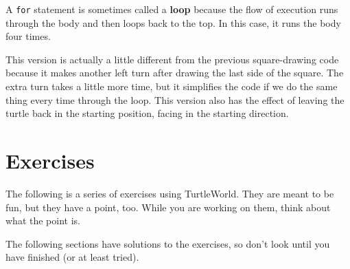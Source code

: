 \documentclass[10pt]{book}
\begin{document}

A {\tt for} statement is sometimes called a {\bf loop} because
the flow of execution runs through the body and then loops back
to the top.  In this case, it runs the body four times.

This version is actually a little different from the previous
square-drawing code because it makes another left turn after
drawing the last side of the square.  The extra turn takes a little
more time, but it simplifies the code if we do the same thing
every time through the loop.  This version also has the effect
of leaving the turtle back in the starting position, facing in
the starting direction.

\section{Exercises}

The following is a series of exercises using TurtleWorld.  They
are meant to be fun, but they have a point, too.  While you are
working on them, think about what the point is.

The following sections have solutions to the exercises, so
don't look until you have finished (or at least tried).
\end{document}
